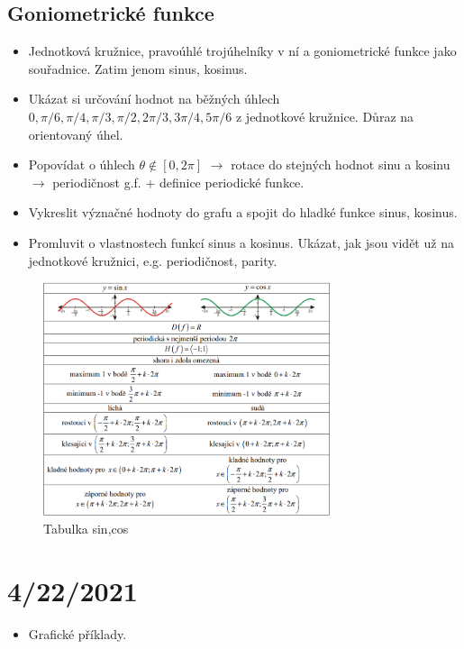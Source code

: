\documentclass[11pt,a4paper]{article}
\begin{document}
        \subsection*{Goniometrické funkce}
        \begin{itemize}
            \item Jednotková kružnice, pravoúhlé trojúhelníky v ní a goniometrické funkce jako souřadnice. Zatim jenom sinus, kosinus.
            \item Ukázat si určování hodnot na běžných úhlech $0,\pi/6,\pi/4,\pi/3,\pi/2,2\pi/3,3\pi/4,5\pi/6$ z jednotkové kružnice. Důraz na orientovaný úhel.
            \item Popovídat o úhlech $\theta \not\in [0,2\pi]$ $\rightarrow$ rotace do stejných hodnot sinu a kosinu $\rightarrow$ periodičnost g.f. + definice periodické funkce.
            \item Vykreslit význačné hodnoty do grafu a spojit do hladké funkce sinus, kosinus.
            \item Promluvit o vlastnostech funkcí sinus a kosinus. Ukázat, jak jsou vidět už na jednotkové kružnici, e.g. periodičnost, parity.
        \end{itemize}
        \begin{figure}[!htb]
            \centering
            \includegraphics[width=0.75\textwidth]{figs/gf-tab.png}
            \caption{Tabulka sin,cos}
        \end{figure}

    \section*{4/22/2021}
        
        \begin{itemize}
            \item Grafické příklady.
        \end{itemize}
\end{document}
